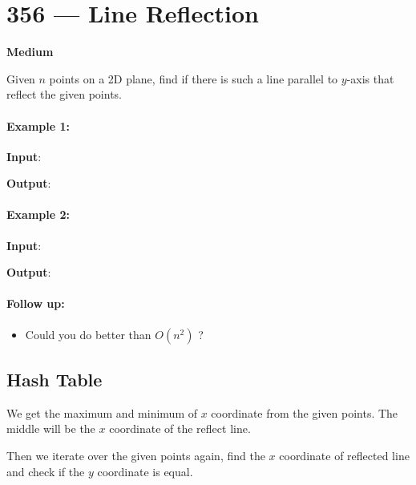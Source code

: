 \section{356 --- Line Reflection}

\textbf{Medium}

Given $n$ points on a 2D plane, find if there is such a line parallel to $y$-axis that reflect the given points.

\paragraph{Example 1:}

\begin{flushleft}
\textbf{Input}: \fcj{[[1,1],[-1,1]]}

\textbf{Output}: 
\end{flushleft}

\paragraph{Example 2:}

\begin{flushleft}
\textbf{Input}: \fcj{[[1,1],[-1,-1]]}

\textbf{Output}: 
\end{flushleft}

\paragraph{Follow up:}

\begin{itemize}
\item Could you do better than $O(n^2)$ ?
\end{itemize}

\subsection{Hash Table}
We get the maximum and minimum of $x$ coordinate from the given points. The middle will be the $x$ coordinate of the reflect line.

Then we iterate over the given points again, find the $x$ coordinate of reflected line and check if the $y$ coordinate is equal.

